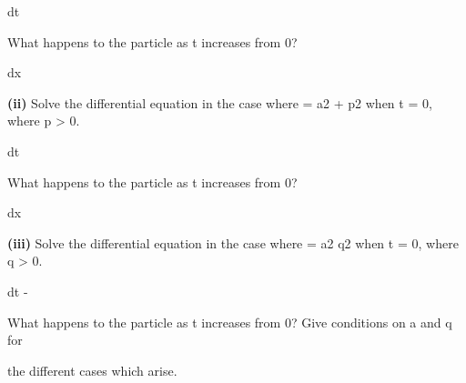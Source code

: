 \documentclass[12pt]{article}
\begin{document}
\begin{flushleft}
dt\par
What happens to the particle as t increases from 0?\par
dx\par
\textbf{(ii)} Solve the differential equation in the case where = a2 + p2 when t = 0, where p > 0.\par
dt\par
What happens to the particle as t increases from 0?\par
dx\par
\textbf{(iii)} Solve the differential equation in the case where = a2 q2 when t = 0, where q > 0.\par
dt -\par
What happens to the particle as t increases from 0? Give conditions on a and q for\par
the different cases which arise.\par
\end{flushleft}
\end{document}
